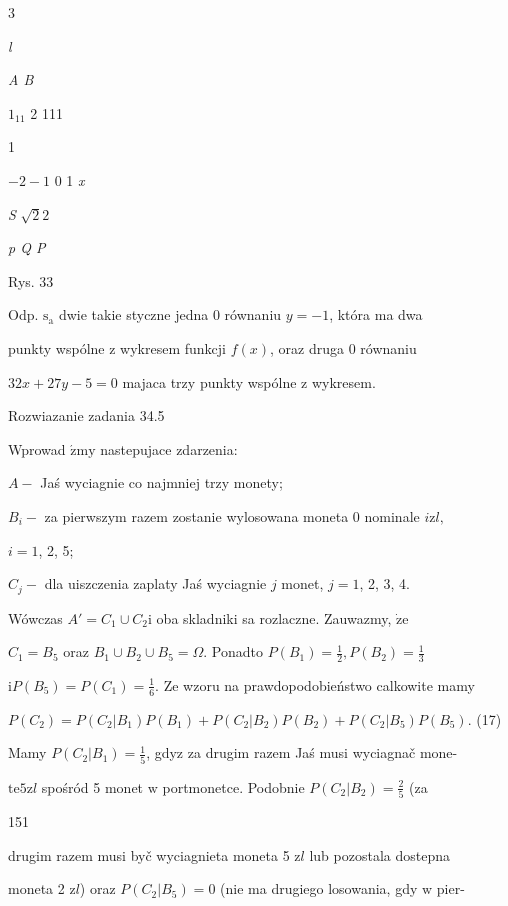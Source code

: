 \documentclass[a4paper,12pt]{article}
\begin{document}
3

{\it l}

{\it A  B}

$1_{11}$  2  111

1

$-2  -1$  0 1  {\it x}

{\it S}  $\sqrt{2}2$

{\it p  Q  P}

Rys. 33

Odp. $\mathrm{s}_{\mathrm{a}}$ dwie takie styczne jedna $0$ równaniu $y= -1$, która ma dwa

punkty wspólne $\mathrm{z}$ wykresem funkcji $f(x)$, oraz druga $0$ równaniu

$32x+27y-5=0$ majaca trzy punkty wspólne $\mathrm{z}$ wykresem.

Rozwiazanie zadania 34.5

Wprowad $\acute{\mathrm{z}}\mathrm{m}\mathrm{y}$ nastepujace zdarzenia:

$A-$ Jaś wyciagnie co najmniej trzy monety;

$B_{i}-$ za pierwszym razem zostanie wylosowana moneta $0$ nominale $i \mathrm{z}l,$

$i=1$, 2, 5;

$C_{j}-$ dla uiszczenia zaplaty Jaś wyciagnie $j$ monet, $j=1$, 2, 3, 4.

Wówczas $A' = C_{1}\cup C_{2} \mathrm{i}$ oba skladniki sa rozlaczne. Zauwazmy, $\dot{\mathrm{z}}\mathrm{e}$

$C_{1} = B_{5}$ oraz $B_{1}\cup B_{2}\cup B_{5} = \Omega$. Ponadto $P(B_{1}) = \displaystyle \frac{1}{2}, P(B_{2}) = \displaystyle \frac{1}{3}$

$\displaystyle \mathrm{i}P(B_{5})=P(C_{1})=\frac{1}{6}$. Ze wzoru na prawdopodobieństwo calkowite mamy

$P(C_{2})=P(C_{2}|B_{1})P(B_{1})+P(C_{2}|B_{2})P(B_{2})+P(C_{2}|B_{5})P(B_{5})$.   (17)

Mamy $P(C_{2}|B_{1})=\displaystyle \frac{1}{5}$, gdyz za drugim razem Jaś musi wyciagnač mone-

$\mathrm{t}\mathrm{e} 5 \mathrm{z}l$ spośród 5 monet $\mathrm{w}$ portmonetce. Podobnie $P(C_{2}|B_{2}) = \displaystyle \frac{2}{5}$ (za





151

drugim razem musi byč wyciagnieta moneta 5 $\mathrm{z}l$ lub pozostala dostepna

moneta 2 $\mathrm{z}l$) oraz $P(C_{2}|B_{5}) =0$ (nie ma drugiego losowania, gdy $\mathrm{w}$ pier-
\end{document}
